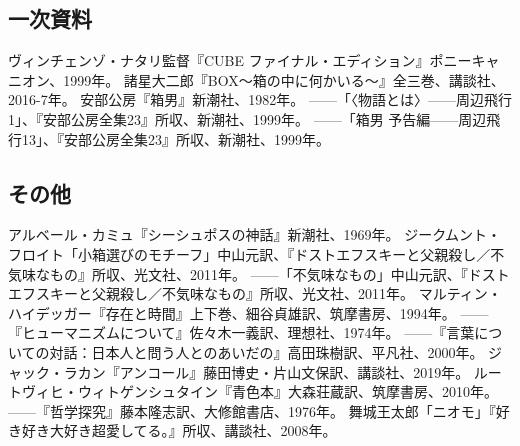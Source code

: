 \documentclass[a4paper]{jsarticle}
\begin{document}
\clearpage
\begin{thebibliography}{99}
	
\subsection*{一次資料}
ヴィンチェンゾ・ナタリ監督『CUBE ファイナル・エディション』ポニーキャニオン、1999年。
諸星大二郎『BOX～箱の中に何かいる～』全三巻、講談社、2016-7年。
安部公房『箱男』新潮社、1982年。
------「〈物語とは〉------周辺飛行1」、『安部公房全集23』所収、新潮社、1999年。
------「箱男 予告編------周辺飛行13」、『安部公房全集23』所収、新潮社、1999年。
\subsection*{その他}
アルベール・カミュ『シーシュポスの神話』新潮社、1969年。
ジークムント・フロイト「小箱選びのモチーフ」中山元訳、『ドストエフスキーと父親殺し／不気味なもの』所収、光文社、2011年。
------「不気味なもの」中山元訳、『ドストエフスキーと父親殺し／不気味なもの』所収、光文社、2011年。
マルティン・ハイデッガー『存在と時間』上下巻、細谷貞雄訳、筑摩書房、1994年。
------『ヒューマニズムについて』佐々木一義訳、理想社、1974年。
------『言葉についての対話：日本人と問う人とのあいだの』高田珠樹訳、平凡社、2000年。
ジャック・ラカン『アンコール』藤田博史・片山文保訳、講談社、2019年。
ルートヴィヒ・ウィトゲンシュタイン『青色本』大森荘蔵訳、筑摩書房、2010年。
------『哲学探究』藤本隆志訳、大修館書店、1976年。
舞城王太郎「ニオモ」『好き好き大好き超愛してる。』所収、講談社、2008年。
\end{thebibliography}
\end{document}
